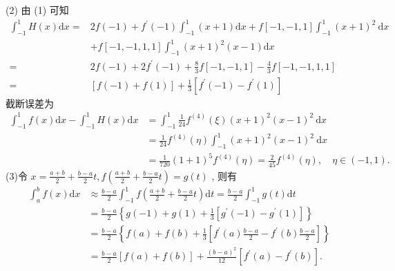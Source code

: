 \begin{tcolorbox}[enhanced,colback=10,colframe=9,breakable,coltitle=green!25!black,title=2024]
(2) 由 (1) 可知
$$
\begin{aligned}
\int_{-1}^{1} H(x) \mathrm{d} x= & 2 f(-1)+f^{\prime}(-1) \int_{-1}^{1}(x+1) \mathrm{d} x+f[-1,-1,1] \int_{-1}^{1}(x+1)^{2} \mathrm{~d} x \\
& +f[-1,-1,1,1] \int_{-1}^{1}(x+1)^{2}(x-1) \mathrm{d} x \\
= & 2 f(-1)+2 f^{\prime}(-1)+\frac{8}{3} f[-1,-1,1]-\frac{4}{3} f[-1,-1,1,1] \\
= & {[f(-1)+f(1)]+\frac{1}{3}\left[f^{\prime}(-1)-f^{\prime}(1)\right] }
\end{aligned}
$$
截断误差为
$$
\begin{aligned}
\int_{-1}^{1} f(x) \mathrm{d} x-\int_{-1}^{1} H(x) \mathrm{d} x & =\int_{-1}^{1} \frac{1}{24} f^{(4)}(\xi)(x+1)^{2}(x-1)^{2} \mathrm{~d} x \\
& =\frac{1}{24} f^{(4)}(\eta) \int_{-1}^{1}(x+1)^{2}(x-1)^{2} \mathrm{~d} x \\
& =\frac{1}{720}(1+1)^{5} f^{(4)}(\eta)=\frac{2}{45} f^{(4)}(\eta), \quad \eta \in(-1,1) .
\end{aligned}
$$
(3)令  $x=\frac{a+b}{2}+\frac{b-a}{2} t, f\left(\frac{a+b}{2}+\frac{b-a}{2} t\right)=g(t)$ , 则有 
$$
\begin{aligned}
\int_{a}^{b} f(x) \mathrm{d} x &\approx \frac{b-a}{2} \int_{-1}^{1} f\left(\frac{a+b}{2}+\frac{b-a}{2} t\right) \mathrm{d} t=\frac{b-a}{2} \int_{-1}^{1} g(t) \mathrm{d} t \\
&=\frac{b-a}{2}\left\{g(-1)+g(1)+\frac{1}{3}\left[g^{\prime}(-1)-g^{\prime}(1)\right]\right\} \\
&=\frac{b-a}{2}\left\{f(a)+f(b)+\frac{1}{3}\left[f^{\prime}(a) \frac{b-a}{2}-f^{\prime}(b) \frac{b-a}{2}\right]\right\} \\
&=\frac{b-a}{2}[f(a)+f(b)]+\frac{(b-a)^{2}}{12}\left[f^{\prime}(a)-f^{\prime}(b)\right] \text {. } \\
\end{aligned}
$$

\end{tcolorbox}

